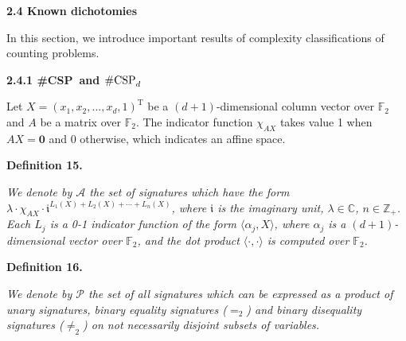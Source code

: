 \documentclass[10pt,a4paper]{article}
\begin{document}





\par\medskip\noindent\textbf{
2.4 Known dichotomies}\par




In this section, we introduce important results of complexity classifications of counting problems.\par




\par\medskip\noindent\textbf{
2.4.1 \#CSP and $\textup{{\#CSP}}_{d}$
}\par




Let $X=(x_{1},x_{2},\ldots,x_{d},1)^{\mathrm{T}}$ be a $(d+1)$-dimensional column vector over $\mathbb{F}_{2}$ and $A$ be a matrix over $\mathbb{F}_{2}$. The indicator function $\chi_{AX}$ takes value 1 when $AX=\mathbf{0}$ and 0 otherwise, which indicates an affine space.\par





\par\medskip\noindent\textbf{
\textbf{Definition 15}\textbf{.}
}\par



\emph{We denote by $\mathscr{A}$ the set of signatures which have the form $\lambda\cdot\chi_{AX}\cdot\mathfrak{i}^{L_{1}(X)+L_{2}(X)+\cdots+L_{n}(X)}$, where $\mathfrak{i}$ is the imaginary unit, $\lambda\in\mathbb{C}$, $n\in\mathbb{Z}_{+}$. Each $L_{j}$ is a 0-1 indicator function of the form $\langle\alpha_{j},X\rangle$, where $\alpha_{j}$ is a $(d+1)$-dimensional vector over $\mathbb{F}_{2}$, and the dot product $\langle\cdot,\cdot\rangle$ is computed over $\mathbb{F}_{2}$.}\par







\par\medskip\noindent\textbf{
\textbf{Definition 16}\textbf{.}
}\par



\emph{We denote by $\mathscr{P}$ the set of all signatures which can be expressed as a product of unary signatures, binary equality signatures ($=_{2}$) and binary disequality signatures ($\neq_{2}$) on not necessarily disjoint subsets of variables.}\par
\end{document}
